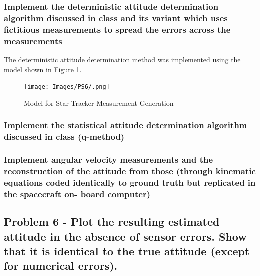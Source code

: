 \subsubsection{Implement the deterministic attitude determination algorithm discussed in class and its variant which uses fictitious measurements to spread the errors across the measurements}

The deterministic attitude determination method was implemented using the model shown in Figure \ref{fig:det_attitude}.

\begin{figure}[H]
    \centering
    \captionsetup{ justification = centering }
    \texttt{[image: Images/PS6/.png]}
    \caption{Model for Star Tracker Measurement Generation}
    \label{fig:det_attitude}
\end{figure}

\subsubsection{Implement the statistical attitude determination algorithm discussed in class (q-method)}

\subsubsection{Implement angular velocity measurements and the reconstruction of the attitude from those (through kinematic equations coded identically to ground truth but replicated in the spacecraft on- board computer)}

\subsection{Problem 6 - Plot the resulting estimated attitude in the absence of sensor errors. Show that it is identical to the true attitude (except for numerical errors).}